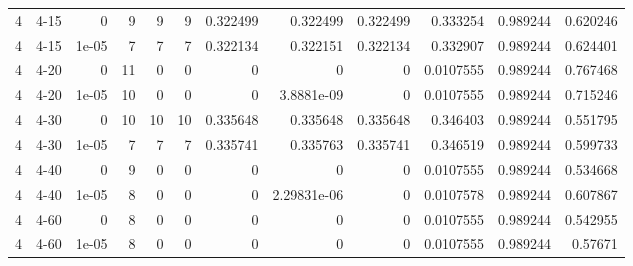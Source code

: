 \begin{tabular}{rlrrrrrrrrrr}
     4 & 4-15   &      0     &           9 &                 9 &                 9 &     0.322499    &     0.322499    &      0.322499    &        0.333254  &               0.989244 &           0.620246 \\
     4 & 4-15   &      1e-05 &           7 &                 7 &                 7 &     0.322134    &     0.322151    &      0.322134    &        0.332907  &               0.989244 &           0.624401 \\
     4 & 4-20   &      0     &          11 &                 0 &                 0 &     0           &     0           &      0           &        0.0107555 &               0.989244 &           0.767468 \\
     4 & 4-20   &      1e-05 &          10 &                 0 &                 0 &     0           &     3.8881e-09  &      0           &        0.0107555 &               0.989244 &           0.715246 \\
     4 & 4-30   &      0     &          10 &                10 &                10 &     0.335648    &     0.335648    &      0.335648    &        0.346403  &               0.989244 &           0.551795 \\
     4 & 4-30   &      1e-05 &           7 &                 7 &                 7 &     0.335741    &     0.335763    &      0.335741    &        0.346519  &               0.989244 &           0.599733 \\
     4 & 4-40   &      0     &           9 &                 0 &                 0 &     0           &     0           &      0           &        0.0107555 &               0.989244 &           0.534668 \\
     4 & 4-40   &      1e-05 &           8 &                 0 &                 0 &     0           &     2.29831e-06 &      0           &        0.0107578 &               0.989244 &           0.607867 \\
     4 & 4-60   &      0     &           8 &                 0 &                 0 &     0           &     0           &      0           &        0.0107555 &               0.989244 &           0.542955 \\
     4 & 4-60   &      1e-05 &           8 &                 0 &                 0 &     0           &     0           &      0           &        0.0107555 &               0.989244 &           0.57671  \\
\hline
\end{tabular}
